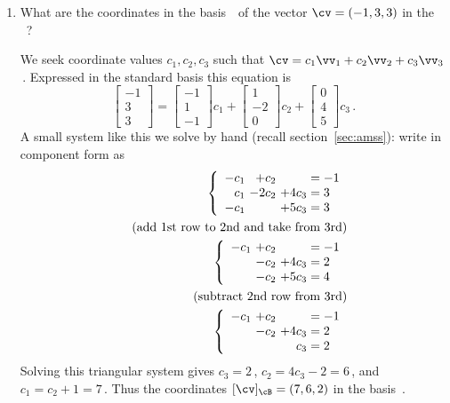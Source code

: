 \begin{example}
\begin{enumerate}
\item What are the coordinates in the basis~\cB\ of the vector \(\cv=(-1,3,3)\) in the ~\cE?
\begin{solution} 
We seek coordinate values \(c_1,c_2,c_3\) such that \(\cv=c_1\vv_1+c_2\vv_2+c_3\vv_3\)\,. 
Expressed in the standard basis this equation is
\begin{equation*}
\begin{bmatrix} -1\\3\\3 \end{bmatrix}=
\begin{bmatrix} -1\\1\\-1 \end{bmatrix}c_1+
\begin{bmatrix} 1\\-2\\0 \end{bmatrix}c_2+
\begin{bmatrix} 0\\4\\5 \end{bmatrix}c_3\,.
\end{equation*}
A small system like this we solve by hand (recall section~\ref{sec:amss}): write in component form as
\begin{eqnarray*}
&&\left\{\begin{array}{r@{\ }r@{\ }r@{{}={}}l}  
-c_1&+c_2&&-1 \\
c_1&-2c_2&+4c_3&3 \\
-c_1&&+5c_3&3
\end{array}\right.
\\&&(\text{add 1st row to 2nd and take from 3rd})
\\&&\left\{\begin{array}{r@{\ }r@{\ }r@{{}={}}l}  
-c_1&+c_2&&-1 \\
&-c_2&+4c_3&2 \\
&-c_2&+5c_3&4
\end{array}\right.
\\&&(\text{subtract 2nd row from 3rd})
\\&&\left\{\begin{array}{r@{\ }r@{\ }r@{{}={}}l}  
-c_1&+c_2&&-1 \\
&-c_2&+4c_3&2 \\
&&c_3&2
\end{array}\right.
\end{eqnarray*}
Solving this triangular system gives \(c_3=2\)\,, \(c_2=4c_3-2=6\)\,, and \(c_1=c_2+1=7\)\,.
Thus the coordinates \([\cv]_\cB=(7,6,2)\) in the basis~\cB.
\end{solution}



\end{enumerate}
\end{example}
